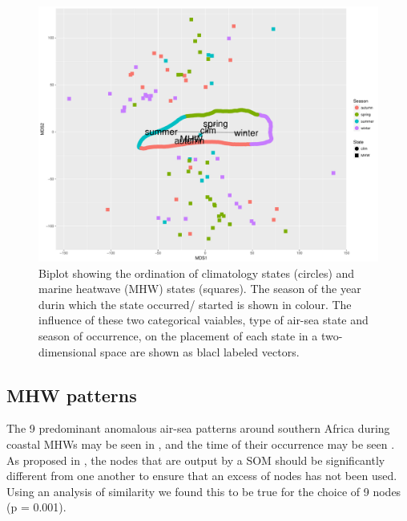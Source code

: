 \documentclass[a4paper,10pt,review]{elsarticle}
\begin{document}
\begin{figure}
\includegraphics[width=1.0\textwidth]{figure_3.pdf}
\caption{Biplot showing the ordination of climatology states (circles) and marine heatwave (MHW) states (squares). The season of the year durin which the state occurred/ started is shown in colour. The influence of these two categorical vaiables, type of air-sea state and season of occurrence, on the placement of each state in a two-dimensional space are shown as blacl labeled vectors.}
\label{figure3}
\end{figure}

\subsection{MHW patterns}


The 9 predominant anomalous air-sea patterns around southern Africa during coastal MHWs may be seen in , and the time of their occurrence may be seen . As proposed in \citet{Johnson2013}, the nodes that are output by a SOM should be significantly different from one another to ensure that an excess of nodes has not been used. Using an analysis of similarity we found this to be true for the choice of 9 nodes (p = 0.001).
\end{document}
